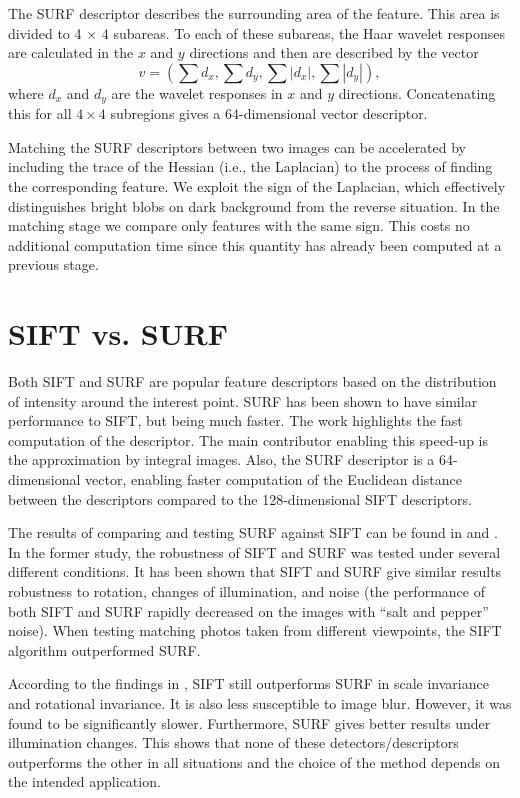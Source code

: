 The SURF descriptor describes the surrounding area of the feature.
This area is divided to 4 $\times$ 4 subareas.
To each of these subareas, the Haar wavelet responses are calculated in the $x$ and $y$ directions and then are described by the vector
$$v = (\sum{d_x}, \sum{d_y}, \sum{|d_x|}, \sum{|d_y|}),$$
where  $d_x$ and $d_y$ are the wavelet responses in $x$ and $y$ directions.
Concatenating this for all $4 \times 4$ subregions gives a $64$-dimensional vector descriptor.

Matching the SURF descriptors between two images can be accelerated by including the trace of the Hessian (i.e., the Laplacian) to the process of finding the corresponding feature. 
We exploit the sign of the Laplacian, which effectively distinguishes bright blobs on dark background from the reverse situation. 
In the matching stage we compare only features with the same sign. 
This costs no additional computation time since this quantity has already been computed at a previous stage.

\section{SIFT vs. SURF}
Both SIFT and SURF are popular feature descriptors based on the distribution of intensity around the interest point.
SURF has been shown to have similar performance to SIFT, but being much faster.
The work \cite{surf2006} highlights the fast computation of the descriptor.
The main contributor enabling this speed-up is the approximation by integral images. 
Also, the SURF descriptor is a 64-dimensional vector, enabling faster computation of the Euclidean distance between the descriptors compared to the 128-dimensional SIFT descriptors.

The results of comparing and testing SURF against SIFT can be found in \cite{siftsurf2001} and \cite{siftsurf2009}.
In the former study, the robustness of SIFT and SURF was tested under several different conditions.
It has been shown that SIFT and SURF give similar results robustness to rotation, changes of illumination, and noise 
(the performance of both SIFT and SURF rapidly decreased on the images with ``salt and pepper'' noise).
When testing matching photos taken from different viewpoints, the SIFT algorithm outperformed SURF.

According to the findings in \cite{siftsurf2009}, SIFT still outperforms SURF in scale invariance and rotational invariance. 
It is also less susceptible to image blur. 
However, it was found to be significantly slower. 
Furthermore, SURF gives better results under illumination changes. 
This shows that none of these detectors/descriptors outperforms the other in all situations and the choice of the method depends on the intended application.

